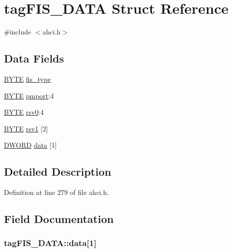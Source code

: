 \hypertarget{structtagFIS__DATA}{}\section{tag\+F\+I\+S\+\_\+\+D\+A\+TA Struct Reference}
\label{structtagFIS__DATA}


{\ttfamily \#include $<$ahci.\+h$>$}

\subsection*{Data Fields}
\begin{DoxyCompactItemize}
\item 
\hyperlink{ahci_8h_aae9749d96e15ccb4f482dd5f55d98f9b}{B\+Y\+TE} \hyperlink{structtagFIS__DATA_abb427e86d341bee8aeca526b9c3a6990}{fis\+\_\+type}
\item 
\hyperlink{ahci_8h_aae9749d96e15ccb4f482dd5f55d98f9b}{B\+Y\+TE} \hyperlink{structtagFIS__DATA_ae7d98fe7684becad3fe600e1fa4b0fb5}{pmport}\+:4
\item 
\hyperlink{ahci_8h_aae9749d96e15ccb4f482dd5f55d98f9b}{B\+Y\+TE} \hyperlink{structtagFIS__DATA_ad3600f99fbe5de9ecbdf18b8260976f9}{rsv0}\+:4
\item 
\hyperlink{ahci_8h_aae9749d96e15ccb4f482dd5f55d98f9b}{B\+Y\+TE} \hyperlink{structtagFIS__DATA_a03522bbeeea5fb2b2fff06cafb32076a}{rsv1} \mbox{[}2\mbox{]}
\item 
\hyperlink{ahci_8h_af483253b2143078cede883fc3c111ad2}{D\+W\+O\+RD} \hyperlink{structtagFIS__DATA_a76695416f029e2fdfb4be2c20c302f02}{data} \mbox{[}1\mbox{]}
\end{DoxyCompactItemize}


\subsection{Detailed Description}


Definition at line 279 of file ahci.\+h.



\subsection{Field Documentation}
\subsubsection[{\texorpdfstring{data}{data}}]{ tag\+F\+I\+S\+\_\+\+D\+A\+T\+A\+::data\mbox{[}1\mbox{]}}\hypertarget{structtagFIS__DATA_a76695416f029e2fdfb4be2c20c302f02}{}\label{structtagFIS__DATA_a76695416f029e2fdfb4be2c20c302f02}


